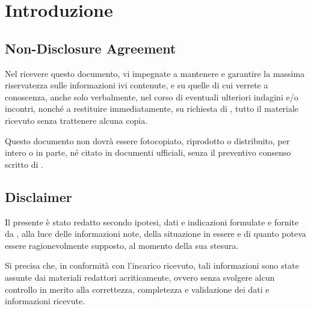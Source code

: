 \newcommand{\sharedPath}{../shared}
\newcommand{\doctitle}{Business Plan}









\section{Introduzione}

\subsection{Non-Disclosure Agreement}
Nel ricevere questo documento, vi impegnate a mantenere e garantire la massima riservatezza sulle informazioni ivi contenute, e su quelle di cui verrete a conoscenza, anche solo verbalmente, nel corso di eventuali ulteriori indagini e/o incontri, nonché a restituire immediatamente, su richiesta di \team, tutto il materiale ricevuto senza trattenere alcuna copia.

Questo documento non dovrà essere fotocopiato, riprodotto o distribuito, per intero o in parte, né citato in documenti ufficiali, senza il preventivo consenso scritto di \team.

\subsection{Disclaimer}
Il presente  è stato redatto secondo ipotesi, dati e indicazioni formulate e fornite da \customer, alla luce delle informazioni note, della situazione in essere e di quanto poteva essere ragionevolmente supposto, al momento della sua stesura.

Si precisa che, in conformità con l'incarico ricevuto, tali informazioni sono state assunte dai materiali redattori acriticamente, ovvero senza svolgere alcun controllo in merito alla correttezza, completezza e validazione dei dati e informazioni ricevute.


